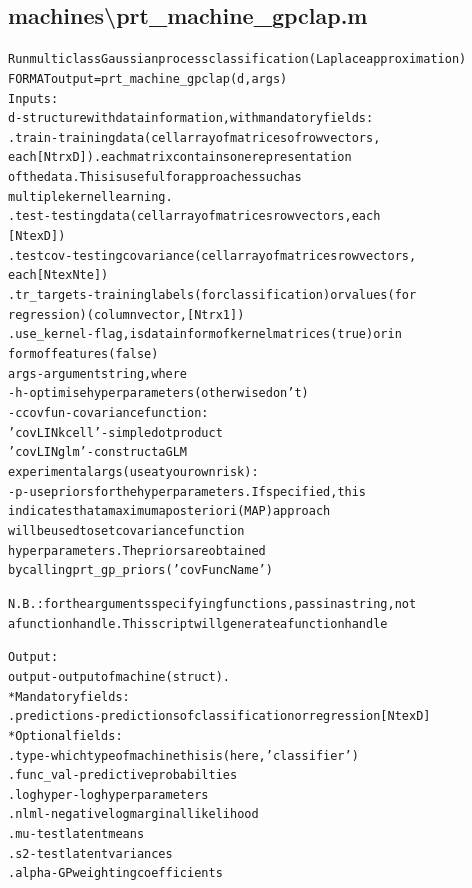 \subsection{machines\textbackslash prt\_machine\_gpclap.m}
\begin{alltt}

 Run multiclass Gaussian process classification (Laplace approximation)
 FORMAT output = prt\_machine\_gpclap(d,args)
 Inputs:
   d         - structure with data information, with mandatory fields:
     .train      - training data (cell array of matrices of row vectors,
                   each [Ntr x D]). each matrix contains one representation
                   of the data. This is useful for approaches such as
                   multiple kernel learning.
     .test       - testing data  (cell array of matrices row vectors, each
                   [Nte x D])
     .testcov    - testing covariance (cell array of matrices row vectors,
                   each [Nte x Nte])
     .tr\_targets - training labels (for classification) or values (for
                   regression) (column vector, [Ntr x 1])
     .use\_kernel - flag, is data in form of kernel matrices (true) or in 
                   form of features (false)
    args     - argument string, where
       -h         - optimise hyperparameters (otherwise don't)
       -c covfun  - covariance function:
                       'covLINkcell' - simple dot product
                       'covLINglm'   - construct a GLM
    experimental args (use at your own risk):
       -p         - use priors for the hyperparameters. If specified, this
                    indicates that a maximum a posteriori (MAP) approach
                    will be used to set covariance function
                    hyperparameters. The priors are obtained 
                    by calling prt\_gp\_priors('covFuncName')
 
       N.B.: for the arguments specifying functions, pass in a string, not
       a function handle. This script will generate a function handle
 
 Output:
    output  - output of machine (struct).
     * Mandatory fields:
      .predictions - predictions of classification or regression [Nte x D]
     * Optional fields:
      .type     - which type of machine this is (here, 'classifier')
      .func\_val - predictive probabilties
      .loghyper - log hyperparameters
      .nlml     - negative log marginal likelihood
      .mu       - test latent means
      .s2       - test latent variances
      .alpha    - GP weighting coefficients
\end{alltt}


